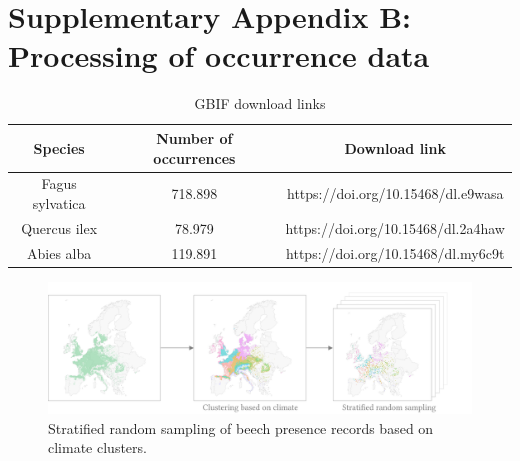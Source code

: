\documentclass[11pt,]{article}
\begin{document}
\newpage

\hypertarget{appendixB}{%
\section{Supplementary Appendix B: Processing of occurrence
data}\label{appendixB}}

\renewcommand*\thetable{B.\arabic{table}}
\renewcommand*\thefigure{B.\arabic{figure}}

\setcounter{figure}{0}
\setcounter{table}{0}

\renewcommand*{\thepage}{B--\arabic{page}}

\hfill \break

\begin{table}[!h]

\caption{\label{tab:unnamed-chunk-1}GBIF download links}
\centering
\begin{tabular}[t]{ccc}
\toprule
Species & Number of occurrences & Download link\\
\midrule
Fagus sylvatica & 718.898 & https://doi.org/10.15468/dl.e9wasa\\
Quercus ilex & 78.979 & https://doi.org/10.15468/dl.2a4haw\\
Abies alba & 119.891 & https://doi.org/10.15468/dl.my6c9t\\
\bottomrule
\end{tabular}
\end{table}

\hfill \break

\begin{figure}[htbp]

{\centering \includegraphics{figs/files/presence_clustering} 

}

\caption{Stratified random sampling of beech presence records based on climate clusters.}\label{fig:pres_clustering}
\end{figure}
\end{document}
